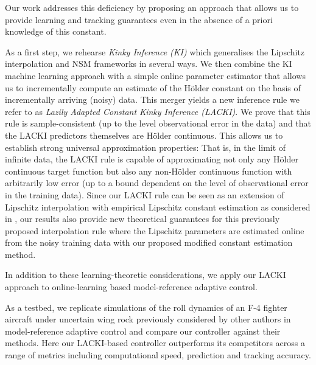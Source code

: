 \documentclass{article} %
\theoremstyle{definition}
\theoremstyle{remark}
\begin{document}
Our work addresses this deficiency by proposing an approach that allows us to provide learning and tracking guarantees even in the absence of a priori knowledge of this constant.

 As a first step, we rehearse \emph{Kinky Inference (KI)} \cite{calliess2014_thesis} which generalises the Lipschitz interpolation and NSM frameworks in several ways.
%
We then combine the KI machine learning approach with a simple online parameter estimator that allows us to incrementally compute an estimate of the H\"older constant on the basis of incrementally arriving (noisy) data. This merger yields a new inference rule we refer to as \emph{Lazily Adapted Constant Kinky Inference (LACKI)}. We prove that this rule is sample-consistent (up to the level observational error in the data) and that the LACKI predictors themselves are H\"older continuous. This allows us to establish strong universal approximation properties: That is, in the limit of infinite data, the LACKI rule is capable of approximating not only any H\"older continuous target function but also any non-H\"older continuous function with arbitrarily low error (up to a bound dependent on the level of observational error in the training data). Since our LACKI rule can be seen as an extension of Lipschitz interpolation with empirical Lipschitz constant estimation as considered in \cite{Beliakov2006}, our results also provide new theoretical guarantees for this previously proposed interpolation rule where the Lipschitz parameters are estimated online from the noisy training data with our proposed modified constant estimation method.

In addition to these learning-theoretic considerations, we apply our LACKI approach to online-learning based model-reference adaptive control.

 As a testbed, we replicate simulations of  the roll dynamics of an F-4 fighter aircraft under uncertain wing rock previously considered by other authors in model-reference adaptive control \cite{Chowdhary2013,Monahemi1996,chowdharyacc2013} and compare our controller against their methods. Here our LACKI-based controller outperforms its competitors across a range of metrics including computational speed, prediction and tracking accuracy. 
\end{document}
